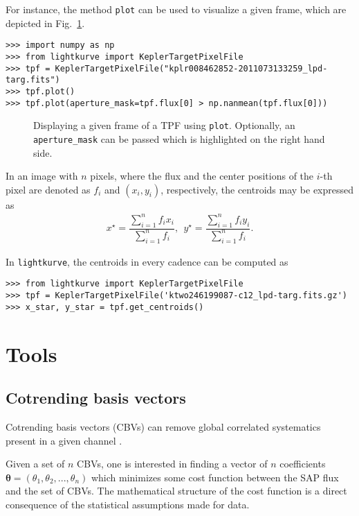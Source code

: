 \documentclass[twocolumn]{aastex62}
\begin{document}
        For instance, the method \texttt{plot} can be used to visualize a
        given frame, which are depicted in Fig.~\ref{fig:plot-method}.
\begin{verbatim}
>>> import numpy as np
>>> from lightkurve import KeplerTargetPixelFile
>>> tpf = KeplerTargetPixelFile("kplr008462852-2011073133259_lpd-targ.fits")
>>> tpf.plot()
>>> tpf.plot(aperture_mask=tpf.flux[0] > np.nanmean(tpf.flux[0]))
\end{verbatim}

\begin{figure}[!htb]
    \centering
    \caption{Displaying a given frame of a TPF using \texttt{plot}.
    Optionally, an \texttt{aperture\_mask} can be passed which is
    highlighted on the right hand side.}
    \label{fig:plot-method}
\end{figure}

In an image with $n$ pixels, where the flux and the center positions of the
$i$-th pixel are denoted as $f_i$ and $(x_i, y_i)$, respectively, the centroids
may be expressed as
\begin{align}
    x^{\star} = \dfrac{\sum_{i=1}^{n} f_i x_i}{\sum_{i=1}^{n}f_i},
    ~~y^{\star} = \dfrac{\sum_{i=1}^{n} f_i y_i}{\sum_{i=1}^{n}f_i}.
\end{align}

In \texttt{lightkurve}, the centroids in every cadence can be computed as
\begin{verbatim}
>>> from lightkurve import KeplerTargetPixelFile
>>> tpf = KeplerTargetPixelFile('ktwo246199087-c12_lpd-targ.fits.gz')
>>> x_star, y_star = tpf.get_centroids()
\end{verbatim}


\section{Tools}

\subsection{Cotrending basis vectors}

Cotrending basis vectors (CBVs) can remove global correlated
systematics present in a given channel \cite{smith2012}.

Given a set of $n$ CBVs, one is interested in finding a vector of $n$
coefficients $\bm{\theta}=(\theta_1, \theta_2, ..., \theta_n)$ which minimizes
some cost function between the SAP flux and the set of CBVs. The mathematical
structure of the cost function is a direct consequence of the statistical
assumptions made for data.
\end{document}
